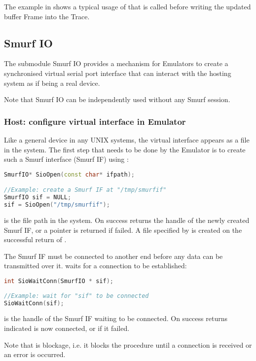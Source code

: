 The example in  shows a typical usage of  that is called before writing the updated buffer Frame into the Trace.


\subsection{Smurf IO}
The submodule Smurf IO provides a mechanism for Emulators to create a synchronised virtual serial port interface that can interact with the hosting system as if being a real device.

Note that Smurf IO can be independently used without any Smurf session.

\subsubsection{Host: configure virtual interface in Emulator}
Like a general device in any UNIX systems, the virtual interface appears as a file in the system. The first step that needs to be done by the Emulator is to create such a Smurf interface (Smurf IF) using :
\begin{lstlisting}[language=C++, caption={SioOpen()\label{api:SioOpenC}}]
SmurfIO* SioOpen(const char* ifpath);

//Example: create a Smurf IF at "/tmp/smurfif"
SmurfIO sif = NULL;
sif = SioOpen("/tmp/smurfif");
\end{lstlisting}

 is the file path in the system. On success  returns the handle of the newly created Smurf IF, or a  pointer is returned if failed. A file specified by  is created on the successful return of .

The Smurf IF must be connected to another end before any data can be transmitted over it.  waits for a connection to be established:
\begin{lstlisting}[language=C++, caption={SioWaitConn()\label{api:SioWaitConnC}}]
int SioWaitConn(SmurfIO * sif);
	
//Example: wait for "sif" to be connected
SioWaitConn(sif);
\end{lstlisting}

 is the handle of the Smurf IF waiting to be connected. On success  returns \SMURFSUCCESS indicated  is now connected, or \SMURFERROR if it failed.

Note that  is blockage, i.e. it blocks the procedure until a connection is received or an error is occurred.

